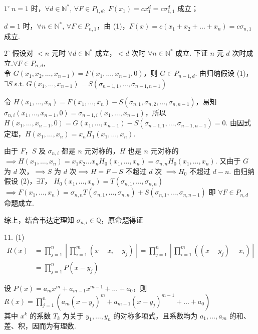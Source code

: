 $1^\circ \ n=1$ 时，$\forall d \in \mathbb{N}^*$, $\forall F \in P_{1,d}$, $F(x_1) = c x_1^d = c \sigma_{1,1}^d$ 成立；

$d=1$ 时，$\forall n \in \mathbb{N}^*$, $\forall F \in P_{n,1}$，由 (1)，$F(x) = c(x_1+x_2+\dots+x_n) = c \sigma_{n,1}$ 成立.

$2^\circ$ 假设对 $<n$ 元时 $\forall d \in \mathbb{N}^*$ 成立，$ < d$ 次时 $\forall n \in \mathbb{N}^*$ 成立. 下证 $n$ 元 $d$ 次时成立.$\forall F \in P_{n,d}$, \\

令 $G(x_1, x_2, \dots, x_{n-1}) = F(x_1, \dots, x_{n-1}, 0)$，则 $G \in P_{n-1,d}$. 由归纳假设 (1)，$\exists S$ s.t. $G(x_1, \dots, x_{n-1}) = S(\sigma_{n-1,1}, \dots, \sigma_{n-1,n-1})$ 

令 $H(x_1, \dots, x_n) = F(x_1, \dots, x_n) - S(\sigma_{n,1}, \sigma_{n,2}, \dots, \sigma_{n,n-1})$，易知 $\sigma_{n,i}(x_1, \dots, x_{n-1}, 0) = \sigma_{n-1,i}(x_1, \dots, x_{n-1})$，所以$ H(x_1, \dots, x_{n-1}, 0) = G(x_1, \dots, x_{n-1}) - S(\sigma_{n-1,1}, \dots, \sigma_{n-1,n-1}) = 0$. 
由因式定理，$H(x_1, \dots, x_n) = x_n H_1(x_1, \dots, x_n)$. 

由于 $F$，$S$ 及 $\sigma_{n,i}$ 都是 $n$ 元对称的，$H$ 也是 $n$ 元对称的$\implies H(x_1, \dots, x_n) = x_1 x_2 \dots x_n H_0(x_1, \dots, x_n) = \sigma_{n,n} H_0(x_1, \dots, x_n)$.
又由于 $G$ 为 $d$ 次，$\implies S$ 为 $d$ 次$\implies H = F - S$ 不超过 $d$ 次 $\implies H_0$ 不超过 $d-n$.
由归纳假设 (2)，$\exists T$， $H_0(x_1, \dots, x_n) = T(\sigma_{n,1}, \dots, \sigma_{n,n})$ $\implies F(x_1, \dots, x_n) = \sigma_{n,n} T(\sigma_{n,1}, \dots, \sigma_{n,n}) + S(\sigma_{n,1}, \dots, \sigma_{n,n-1})$
即 $\forall F \in P_{n,d}$ 命题成立.

综上，结合韦达定理知 $\sigma_{n,i} \in \mathbb{Q}$，原命题得证

\sepline

11.
(1) 
\begin{align*}
    R(x) &= \prod_{j=1}^n \left[ \prod_{i=1}^m (x - x_i - y_j) \right] = \prod_{j=1}^n \left[ \prod_{i=1}^m ((x - y_j) - x_i) \right] \\
    &= \prod_{j=1}^n P(x - y_j)
\end{align*}

设 $P(x) = a_m x^m + a_{m-1} x^{m-1} + \dots + a_0$，则 $R(x) = \prod_{j=1}^n \left( a_m (x - y_j)^m + a_{m-1} (x - y_j)^{m-1} + \dots + a_0 \right)$ \\
其中 $x^k$ 的系数 $T_k$ 为关于 $y_1, \dots, y_n$ 的对称多项式，且系数均为 $a_1, \dots, a_m$ 的和、差、积，因而为有理数. 

